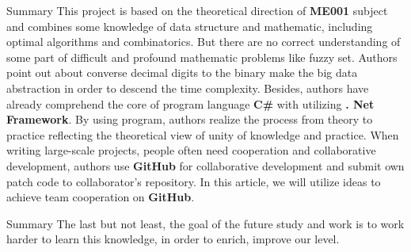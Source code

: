 \documentclass[hyperref={pdfpagelabels=false}]{beamer}
\begin{document}
\begin{frame}{Summary}
    This project is based on the theoretical direction of \textbf{ME001} subject and combines some knowledge of data structure and mathematic, including optimal algorithms and combinatorics. But there are no correct understanding of some part of difficult and profound mathematic problems like fuzzy set. Authors point out about converse decimal digits to the binary make the big data abstraction in order to descend the time complexity. Besides, authors have already comprehend the core of program language \textbf{C\#} with utilizing \textbf{. Net Framework}. By using program, authors realize the process from theory to practice reflecting the theoretical view of unity of knowledge and practice. When writing large-scale projects, people often need cooperation and collaborative development, authors use \textbf{GitHub} for collaborative development and submit own patch code to collaborator's repository. In this article, we will utilize ideas to achieve team cooperation on \textbf{GitHub}.
\end{frame}

\begin{frame}{Summary}
    The last but not least, the goal of the future study and work is to work harder to learn this knowledge, in order to enrich, improve our level.
\end{frame}
\end{document}
